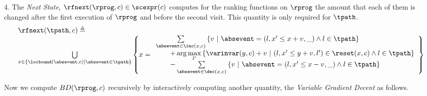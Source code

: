 \begin{defn}
 4. The \emph{Next State}, $\rfnext(\rprog, c) \in \scexpr(c)$ 
 computes for the ranking functions on $\rprog$ the amount that each of them is changed after the first execution of $\rprog$ and before the second visit. This quantity is only required for $\tpath$.
 {\small
 \[
 \begin{array}{l}
 \rfnext(\tpath, c) \triangleq 
 \\
 \bigcup\limits_{x \in \left\{ \locbound(\absevent, c) | \absevent \in \tpath \right\}}
 \left\{ x = 
 \begin{array}{l}
 \sum\limits_{\absevent \in \inc(x, c) }
 \left\{ v ~\middle\vert~ \absevent = (l, x' \leq x + v, \_) \land l \in \tpath\right\}
 \\ \qquad 
 + \arg\max\limits_{l' }
 \left\{ \varinvar(y, c) + v ~\middle\vert~ (l, x' \leq y + v, l') \in \reset(x, c) \land l \in \tpath\right\}
 \\ \qquad 
 - \sum\limits_{ \absevent \in \dec(x, c) }\left\{ 
 v ~\middle\vert~ \absevent = (l, x' \leq x - v, \_) \land l \in \tpath 
 \right\}
 \end{array}
 \right\} 
 \end{array}
 \]
 }
\end{defn}
Now we compute $BD(\rprog, c)$ recursively by interactively computing another quantity, the \emph{Variable Gradient Decent} as follows.
